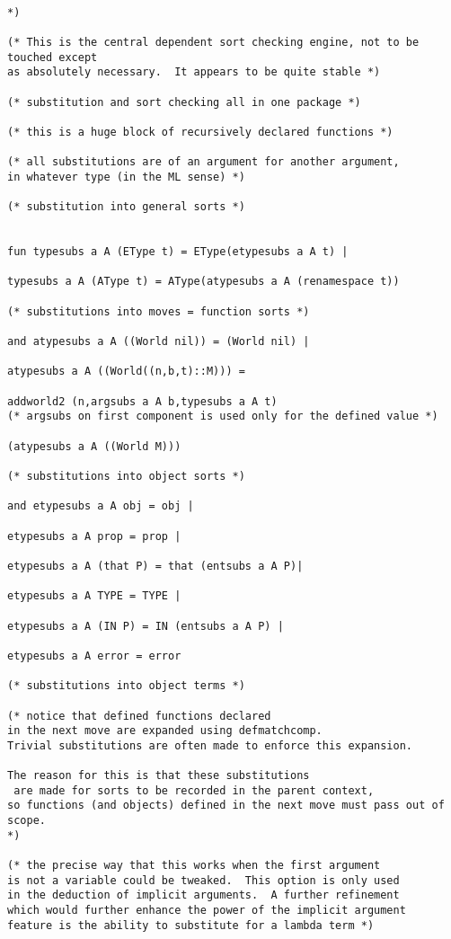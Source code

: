 \documentclass{article}
\begin{document}
\begin{verbatim}

*)

(* This is the central dependent sort checking engine, not to be touched except
as absolutely necessary.  It appears to be quite stable *)

(* substitution and sort checking all in one package *)

(* this is a huge block of recursively declared functions *)

(* all substitutions are of an argument for another argument,
in whatever type (in the ML sense) *)

(* substitution into general sorts *)


fun typesubs a A (EType t) = EType(etypesubs a A t) |

typesubs a A (AType t) = AType(atypesubs a A (renamespace t))

(* substitutions into moves = function sorts *)

and atypesubs a A ((World nil)) = (World nil) |

atypesubs a A ((World((n,b,t)::M))) =

addworld2 (n,argsubs a A b,typesubs a A t)  
(* argsubs on first component is used only for the defined value *)

(atypesubs a A ((World M)))

(* substitutions into object sorts *)

and etypesubs a A obj = obj |

etypesubs a A prop = prop |

etypesubs a A (that P) = that (entsubs a A P)|

etypesubs a A TYPE = TYPE |

etypesubs a A (IN P) = IN (entsubs a A P) |

etypesubs a A error = error

(* substitutions into object terms *)

(* notice that defined functions declared 
in the next move are expanded using defmatchcomp.  
Trivial substitutions are often made to enforce this expansion. 

The reason for this is that these substitutions
 are made for sorts to be recorded in the parent context, 
so functions (and objects) defined in the next move must pass out of scope.
*)

(* the precise way that this works when the first argument
is not a variable could be tweaked.  This option is only used
in the deduction of implicit arguments.  A further refinement
which would further enhance the power of the implicit argument
feature is the ability to substitute for a lambda term *)


\end{verbatim}
\end{document}
